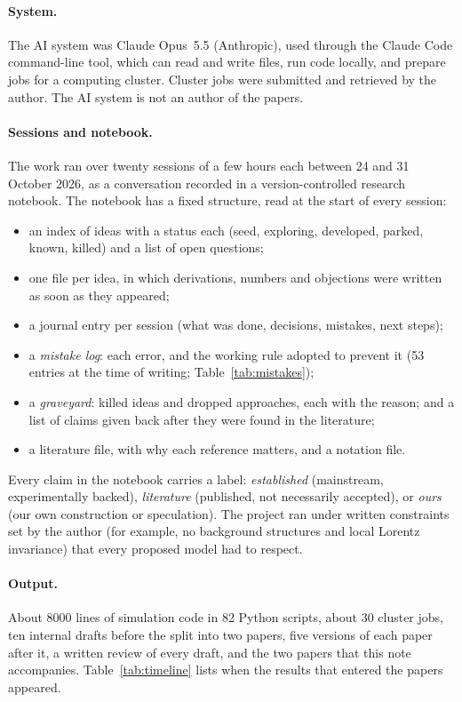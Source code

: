 \documentclass[11pt,a4paper]{article}
\begin{document}
\paragraph{System.} The AI system was Claude Opus~5.5 (Anthropic), used through the Claude Code command-line tool, which can read and write files, run code locally, and prepare jobs for a computing cluster. Cluster jobs were submitted and retrieved by the author. The AI system is not an author of the papers.

\paragraph{Sessions and notebook.} The work ran over twenty sessions of a few hours each between 24 and 31 October 2026, as a conversation recorded in a version-controlled research notebook. The notebook has a fixed structure, read at the start of every session:
\begin{itemize}[itemsep=1pt]
\item an index of ideas with a status each (seed, exploring, developed, parked, known, killed) and a list of open questions;
\item one file per idea, in which derivations, numbers and objections were written as soon as they appeared;
\item a journal entry per session (what was done, decisions, mistakes, next steps);
\item a \emph{mistake log}: each error, and the working rule adopted to prevent it (53 entries at the time of writing; Table~\ref{tab:mistakes});
\item a \emph{graveyard}: killed ideas and dropped approaches, each with the reason; and a list of claims given back after they were found in the literature;
\item a literature file, with why each reference matters, and a notation file.
\end{itemize}
Every claim in the notebook carries a label: \emph{established} (mainstream, experimentally backed), \emph{literature} (published, not necessarily accepted), or \emph{ours} (our own construction or speculation). The project ran under written constraints set by the author (for example, no background structures and local Lorentz invariance) that every proposed model had to respect.

\paragraph{Output.} About 8000 lines of simulation code in 82 Python scripts, about 30 cluster jobs, ten internal drafts before the split into two papers, five versions of each paper after it, a written review of every draft, and the two papers that this note accompanies. Table~\ref{tab:timeline} lists when the results that entered the papers appeared.
\end{document}
